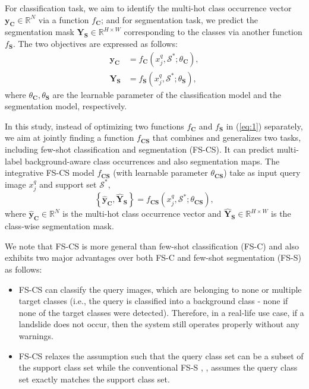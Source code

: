 \documentclass{ieeeaccess}
\newcommand{\congtt}[1]{\textcolor{red}{#1}}
\begin{document}
For classification task, we aim to identify the multi-hot class occurrence vector $\mathbf{y}_\mathbf{C} \in  \mathbb{R}^{N}$ via a function $f_\mathbf{C}$; and for segmentation task, we predict the segmentation mask $\mathbf{Y}_\mathbf{S} \in \mathbb{R}^{H \times W}$ corresponding to the classes via another function $f_\mathbf{S}$. The two objectives are expressed as follows:
\begin{equation}
\label{eq:1}
\begin{aligned}
   \mathbf{y}_\mathbf{C} &= f_\mathbf{C}(x^q_j, \mathcal{S}^* ; \theta_\mathbf{C}), \\
   \mathbf{Y}_\mathbf{S} &= f_\mathbf{S}(x^q_j, \mathcal{S}^* ; \theta_\mathbf{S}),
   \end{aligned}
\end{equation}
where $\theta_\mathbf{C}, \theta_\mathbf{S}$ are the learnable parameter of the classification model and the segmentation model, respectively. %

In this study, instead of optimizing two functions $f_\mathbf{C}$ and $f_\mathbf{S}$ in (\ref{eq:1}) separately, we aim at jointly finding a function $f_\mathbf{CS}$ that combines and generalizes two tasks, including few-shot classification and segmentation (FS-CS). It can predict multi-label background-aware class occurrences and also segmentation maps. The integrative FS-CS model $f_\mathbf{CS}$ (with learnable parameter $\theta_\mathbf{CS}$) take as input query image $x^q_j$ and support set $\mathcal{S}^*$,
\begin{equation}
    \left\{\hat{\mathbf{y}}_{\mathbf{C}}, \hat{\mathbf{Y}}_{\mathbf{S}}\right\}=f_\mathbf{CS}(x^q_j, \mathcal{S}^* ; \theta_\mathbf{CS}),
    \label{eq2}
\end{equation}
where $\hat{\mathbf{y}}_{\mathbf{C}} \in \mathbb{R}^N$ is the multi-hot class occurrence vector and $\hat{\mathbf{Y}}_{\mathbf{S}} \in \mathbb{R}^{H \times W}$ is  the class-wise segmentation
mask.

We note that FS-CS is more general than few-shot classification (FS-C) and also exhibits two major advantages over both FS-C and few-shot segmentation (FS-S) as follows:
\begin{itemize}
  \item FS-CS can classify the query images, which are belonging to none or multiple target classes (i.e., the query is classified into a background class - none if none of the target classes were detected). Therefore, in a real-life use case, if a landslide does not occur, then the system still operates properly without any warnings.
  \item FS-CS relaxes the assumption such that the query class set can be a subset of the support class set while the conventional FS-S \cite{Kaixin2019}, \cite{PFENet}, \cite{HSNet} assumes the query class set exactly matches the support class set.
\end{itemize}
\end{document}
